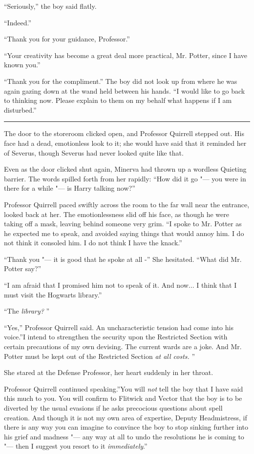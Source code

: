 ``Seriously,'' the boy said flatly.

``Indeed.''

``Thank you for your guidance, Professor.''

``Your creativity has become a great deal more practical, Mr. Potter,
since I have known you.''

``Thank you for the compliment.'' The boy did not look up from where he
was again gazing down at the wand held between his hands. ``I would like
to go back to thinking now. Please explain to them on my behalf what
happens if I am disturbed.''

\begin{center}\rule{3in}{0.4pt}\end{center}

The door to the storeroom clicked open, and Professor Quirrell stepped
out. His face had a dead, emotionless look to it; she would have said
that it reminded her of Severus, though Severus had never looked quite
like that.

Even as the door clicked shut again, Minerva had thrown up a wordless
Quieting barrier. The words spilled forth from her rapidly: ``How did it
go "--- you were in there for a while "--- is Harry talking now?''

Professor Quirrell paced swiftly across the room to the far wall near
the entrance, looked back at her. The emotionlessness slid off his face,
as though he were taking off a mask, leaving behind someone very grim.
``I spoke to Mr. Potter as he expected me to speak, and avoided saying
things that would annoy him. I do not think it consoled him. I do not
think I have the knack.''

``Thank you "--- it is good that he spoke at all -'' She hesitated. ``What
did Mr. Potter say?''

``I am afraid that I promised him not to speak of it. And now... I
think that I must visit the Hogwarts library.''

``The \emph{library?} ''

``Yes,'' Professor Quirrell said. An uncharacteristic tension had come
into his voice.''I intend to strengthen the security upon the Restricted
Section with certain precautions of my own devising. The current wards
are a joke. And Mr. Potter must be kept out of the Restricted Section
\emph{at all costs.} ''

She stared at the Defense Professor, her heart suddenly in her throat.

Professor Quirrell continued speaking.''You will \emph{not} tell the boy
that I have said this much to you. You will confirm to Flitwick and
Vector that the boy is to be diverted by the usual evasions if he asks
precocious questions about spell creation. And though it is not my own
area of expertise, Deputy Headmistress, if there is any way you can
imagine to convince the boy to stop sinking further into his grief and
madness "--- any way at all to undo the resolutions he is coming to "--- then
I suggest you resort to it \emph{immediately}.''
